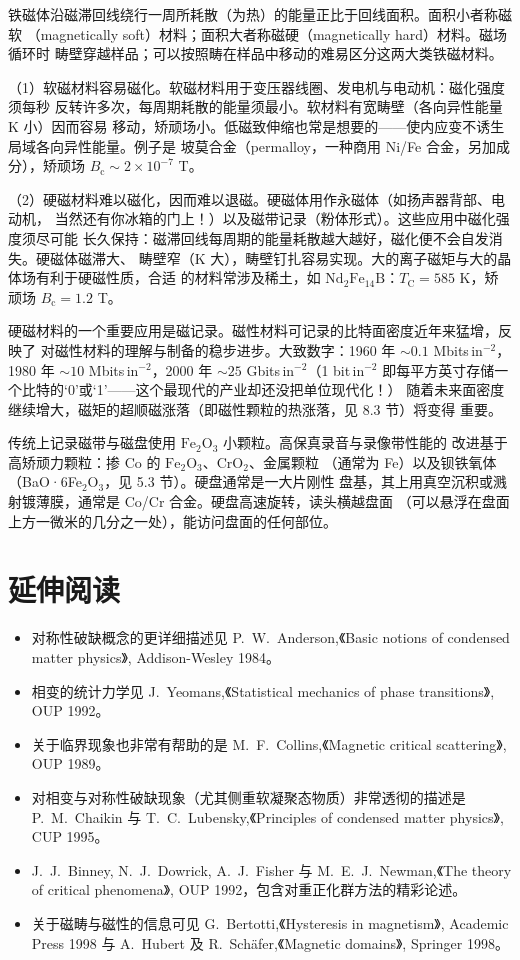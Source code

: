 铁磁体沿磁滞回线绕行一周所耗散（为热）的能量正比于回线面积。面积小者称磁软
（magnetically soft）材料；面积大者称磁硬（magnetically hard）材料。磁场循环时
畴壁穿越样品；可以按照畴在样品中移动的难易区分这两大类铁磁材料。

（1）软磁材料容易磁化。软磁材料用于变压器线圈、发电机与电动机：磁化强度须每秒
反转许多次，每周期耗散的能量须最小。软材料有宽畴壁（各向异性能量 K 小）因而容易
移动，矫顽场小。低磁致伸缩也常是想要的——使内应变不诱生局域各向异性能量。例子是
坡莫合金（permalloy，一种商用 Ni/Fe 合金，另加成分），矫顽场
$B_{\mathrm{c}}\sim2\times10^{-7}$ T。

（2）硬磁材料难以磁化，因而难以退磁。硬磁体用作永磁体（如扬声器背部、电动机，
当然还有你冰箱的门上！）以及磁带记录（粉体形式）。这些应用中磁化强度须尽可能
长久保持：磁滞回线每周期的能量耗散越大越好，磁化便不会自发消失。硬磁体磁滞大、
畴壁窄（K 大），畴壁钉扎容易实现。大的离子磁矩与大的晶体场有利于硬磁性质，合适
的材料常涉及稀土，如 $\mathrm{Nd_2Fe_{14}B}$：$T_{\mathrm{C}}=585$ K，矫顽场
$B_{\mathrm{c}}=1.2$ T。

硬磁材料的一个重要应用是磁记录。磁性材料可记录的比特面密度近年来猛增，反映了
对磁性材料的理解与制备的稳步进步。大致数字：1960 年 $\sim0.1$ Mbits\,in$^{-2}$，
1980 年 $\sim10$ Mbits\,in$^{-2}$，2000 年 $\sim25$ Gbits\,in$^{-2}$（1 bit\,in$^{-2}$
即每平方英寸存储一个比特的‘0’或‘1’——这个最现代的产业却还没把单位现代化！）
随着未来面密度继续增大，磁矩的超顺磁涨落（即磁性颗粒的热涨落，见 8.3 节）将变得
重要。

传统上记录磁带与磁盘使用 $\mathrm{Fe_2O_3}$ 小颗粒。高保真录音与录像带性能的
改进基于高矫顽力颗粒：掺 Co 的 $\mathrm{Fe_2O_3}$、$\mathrm{CrO_2}$、金属颗粒
（通常为 Fe）以及钡铁氧体（BaO·6Fe$_2$O$_3$，见 5.3 节）。硬盘通常是一大片刚性
盘基，其上用真空沉积或溅射镀薄膜，通常是 Co/Cr 合金。硬盘高速旋转，读头横越盘面
（可以悬浮在盘面上方一微米的几分之一处），能访问盘面的任何部位。

\section*{延伸阅读}

\begin{itemize}[itemsep=0.2em]
\item 对称性破缺概念的更详细描述见 P.~W.~Anderson,《Basic notions of condensed
matter physics》, Addison-Wesley 1984。
\item 相变的统计力学见 J.~Yeomans,《Statistical mechanics of phase transitions》,
OUP 1992。
\item 关于临界现象也非常有帮助的是 M.~F.~Collins,《Magnetic critical scattering》,
OUP 1989。
\item 对相变与对称性破缺现象（尤其侧重软凝聚态物质）非常透彻的描述是 P.~M.~Chaikin
与 T.~C.~Lubensky,《Principles of condensed matter physics》, CUP 1995。
\item J.~J.~Binney, N.~J.~Dowrick, A.~J.~Fisher 与 M.~E.~J.~Newman,《The theory
of critical phenomena》, OUP 1992，包含对重正化群方法的精彩论述。
\item 关于磁畴与磁性的信息可见 G.~Bertotti,《Hysteresis in magnetism》, Academic
Press 1998 与 A.~Hubert 及 R.~Sch\"{a}fer,《Magnetic domains》, Springer 1998。
\end{itemize}

